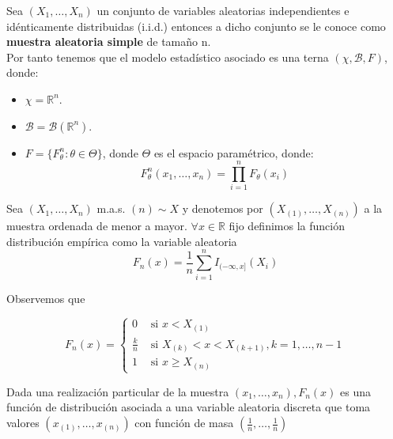 
\begin{definición}
Sea $\left(X_{1}, \ldots, X_{n}\right)$ un conjunto de variables aleatorias independientes e idénticamente distribuidas (i.i.d.) entonces a dicho conjunto se le conoce como \textbf{muestra aleatoria simple} de tamaño n.
\\ Por tanto tenemos que el modelo estadístico asociado es una terna $(\chi, \mathcal{B}, F)$, donde:
\vspace{-\topsep}
\begin{itemize}
	\item $\chi = \mathbb{R}^{n}$.
	\item $\mathcal{B} = \mathcal{B}(\mathbb{R}^{n})$.
	\item $F = \{F_{\theta}^n : \theta \in \Theta\}$, donde $\Theta$ es el espacio paramétrico, donde:
	      \[F_{\theta}^n(x_1, \ldots, x_n) = \prod_{i=1}^{n} F_{\theta}(x_i)\]
\end{itemize}
\end{definición}

\begin{definición}
Sea $\left(X_{1}, \ldots, X_{n}\right)$ m.a.s. $(n) \sim X$ y denotemos por $\left(X_{(1)}, \ldots, X_{(n)}\right)$ a la muestra ordenada de menor a mayor. $\forall x \in \mathbb{R}$ fijo definimos la función distribución empírica como la variable aleatoria $$F_{n}(x)=\frac{1}{n} \sum_{i=1}^{n} I_{(-\infty, x]}\left(X_{i}\right)$$

Observemos que

$$
	F_{n}(x)= \begin{cases}0 & \text { si } x<X_{(1)} \\ \frac{k}{n} & \text { si } X_{(k)}<x<X_{(k+1)}, k=1, \ldots, n-1 \\ 1 & \text { si } x \geq X_{(n)}\end{cases}
$$

Dada una realización particular de la muestra $\left(x_{1}, \ldots,
	x_{n}\right), F_{n}(x)$ es una función de distribución asociada a una variable
aleatoria discreta que toma valores $\left(x_{(1)}, \ldots, x_{(n)}\right)$ con
función de masa $\left(\frac{1}{n}, \ldots, \frac{1}{n}\right)$
\end{definición}

